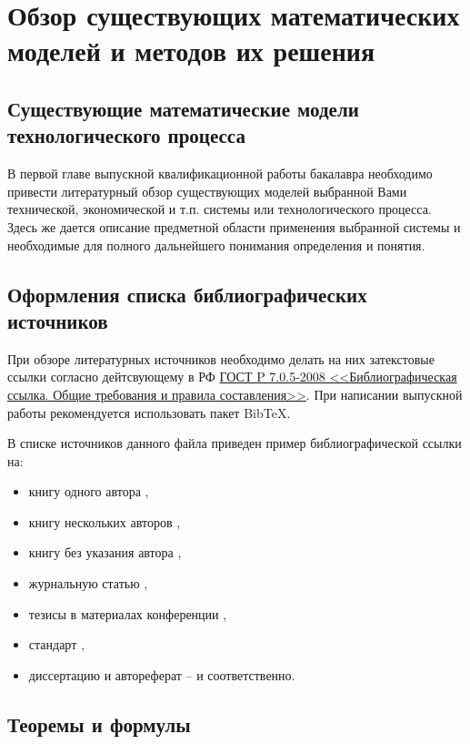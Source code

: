 \newpage

\section{Обзор существующих математических моделей и методов их решения} 

\subsection{Существующие математические модели технологического процесса}

В первой главе выпускной квалификационной работы бакалавра необходимо привести литературный обзор существующих моделей выбранной Вами технической, экономической и т.п. системы или технологического процесса. Здесь же дается описание предметной области применения выбранной системы и необходимые для полного дальнейшего понимания определения и понятия.


\subsection{Оформления списка библиографических источников}

При обзоре литературных источников необходимо делать на них затекстовые ссылки согласно дейтсвующему в РФ  \href{http://www.ivran.ru/attachments/552_P_7_0_5_-2008.pdf}{ГОСТ P 7.0.5-2008 <<Библиографическая ссылка. Общие требования и правила составления>>}. При написании выпускной работы рекомендуется использовать пакет BibTeX.

В списке источников данного файла приведен пример библиографической ссылки на:
\begin{itemize}
	\item книгу одного автора \cite{Krivulin2009},
	\item книгу нескольких авторов \cite{Barichev2011},
	\item книгу без указания автора \cite{BibOp91},
	\item журнальную статью \cite{Melikov92},
	\item тезисы в материалах конференции \cite{Ponomarenko88},
	\item стандарт \cite{GOST7052008},
	\item диссертацию и автореферат -- \cite{KIA95-default} и \cite{KIA95-autoref} соответственно.
\end{itemize}

\subsection{Теоремы и формулы}

